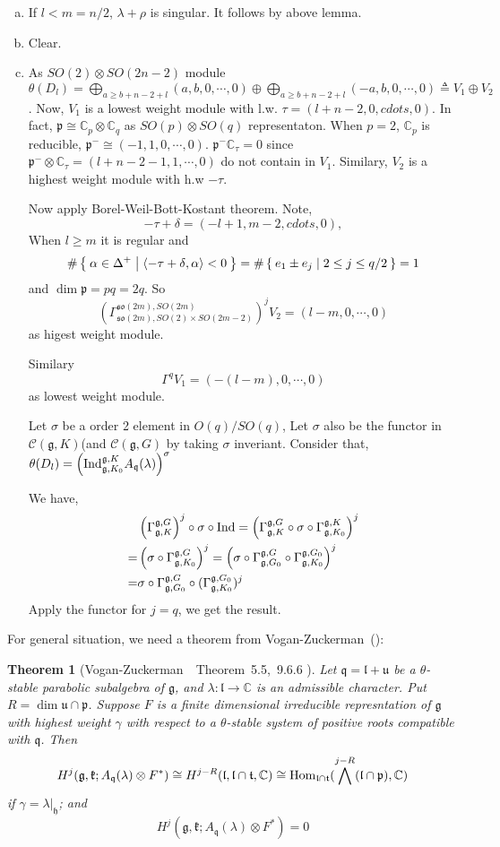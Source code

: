 \documentclass[12pt]{article}
\newtheorem{thm}{Theorem}
\def\Hom{{\rm Hom}}
\def\Ind{{\rm Ind}}
\def\bC{{\mathbb{C}}}
\def\inn#1#2{\left\langle{#1},{#2}\right\rangle}
\def\aso{\mathfrak{so}}
\def\fhh{\mathfrak{h}}
\def\fuu{\mathfrak{u}}
\def\fll{\mathfrak{l}}
\def\fpp{\mathfrak{p}}
\def\fqq{\mathfrak{q}}
\def\ftt{\mathfrak{t}}
\def\fgg{\mathfrak{g}}
\def\fkk{\mathfrak{k}}
\def\ccc{\mathcal{C}}
\def\Ind{{\rm Ind}}
\begin{document}
\begin{enumerate}[a)]
\item If $l<m=n/2$, $\lambda+\rho$ is singular. It follows by above lemma.
\item Clear.
\item As $SO(2)\otimes SO(2n-2)$ module $\theta(D_l)
= \bigoplus_{a\geq b+n-2+l}(a,b,0,\cdots, 0)\oplus \bigoplus_{a\geq b+n-2+l}(-a,b,0,\cdots, 0)
\triangleq V_1\oplus V_2$.
Now, $V_1$ is a lowest weight module with l.w. $\tau=(l+n-2, 0, cdots, 0)$.
In fact, $\fpp\cong \bC_p\otimes \bC_q$ as $SO(p)\otimes SO(q)$ representaton.
When $p=2$, $\bC_p$ is reducible, $\fpp^- \cong (-1, 1,0, \cdots, 0)$.
 $\fpp^-\bC_{\tau}=0$ since $\fpp^-\otimes \bC_{\tau} = (l+n-2-1,1, \cdots, 0)$ do not contain 
in $V_1$. Similary, $V_2$ is a highest weight module with h.w $-\tau$.

Now apply Borel-Weil-Bott-Kostant theorem.
Note,
\[
-\tau+\delta = (-l+1,m-2,cdots, 0),
\]
When $l\geq m$ it is regular and
\[
\#\Set{\alpha\in \Delta^+| \inn{-\tau+\delta}{\alpha}<0}
= \#\Set{e_1\pm e_j|2\leq j\leq q/2} = 1
\]
and $\dim \fpp = pq = 2q$.
So 
\[
\left(\Gamma_{\aso(2m),SO(2)\times SO(2m-2)}^{\aso(2m),SO(2m)}\right)^j V_2= (l-m,0,\cdots, 0) 
\]
as higest weight module. 

Similary
\[
\Gamma^q V_1 = (-(l-m),0,\cdots, 0) 
\]
as lowest weight module.

Let $\sigma$ be a order 2 element in $O(q)/SO(q)$, Let 
$\sigma$ also be the functor in $\ccc(\fgg,K)$(and $\ccc(\fgg,G)$
 by taking $\sigma$ inveriant. 
Consider that, 
$\theta(D_l) = \left(\Ind_{\fgg, K_0}^{\fgg,K}A_\fqq(\lambda)\right)^\sigma$

We have,
\[
\begin{split}
&\left(\Gamma_{\fgg,K}^{\fgg,G}\right)^j\circ \sigma \circ \Ind
= \left(\Gamma_{\fgg,K}^{\fgg,G} \circ \sigma\circ \Gamma_{\fgg, K_0}^{\fgg,K}\right)^j\\
=& \left(\sigma \circ \Gamma_{\fgg,K_0}^{\fgg,G}\right)^j
=  \left(\sigma \circ \Gamma_{\fgg,G_0}^{\fgg,G}\circ \Gamma_{\fgg,K_0}^{\fgg,G_0}\right)^j\\
= & \sigma\circ \Gamma_{\fgg,G_0}^{\fgg,G}\circ (\Gamma_{\fgg,K_0}^{\fgg,G_0})^j
\end{split}
\]
Apply the functor for $j=q$, we get the result. 
\end{enumerate}

For general situation, we need a theorem from Vogan-Zuckerman~(\cite{VoganZuckerman1984}):
\begin{thm}[Vogan-Zuckerman~\cite{VoganZuckerman1984}~Theorem~5.5,\cite{Wallach1988}~9.6.6 ]
Let $\fqq=\fll+\fuu$ be a $\theta$-stable parabolic subalgebra of $\fgg$,
and $\lambda\colon \fll\to \bC$ is an admissible character. 
Put $R = \dim \fuu\cap \fpp$. Suppose $F$ is a finite dimensional irreducible
represntation of $\fgg$ with highest weight $\gamma$ with respect to a 
$\theta$-stable system of positive roots compatible with $\fqq$. Then 
\[
H^j(\fgg,\fkk;A_\fqq(\lambda)\otimes F^*) \cong H^{j-R}(\fll,\fll\cap \ftt,\bC)
\cong \Hom_{\fll\cap \ftt}(\bigwedge^{j-R}(\fll\cap \fpp),\bC)
\]
if $\gamma = \lambda|_\fhh$; and
\[
H^j(\fgg,\fkk;A_\fqq(\lambda)\otimes F^*) = 0
\]
\end{thm}
\end{document}
